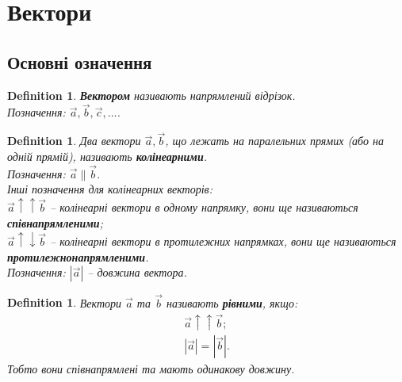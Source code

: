 \documentclass[a4paper, 10pt]{extarticle}
\theoremstyle{theoremdd}
\theoremstyle{theoremdd}
\newtheorem{definition}[theorem]{Definition}
\theoremstyle{theoremdd}
\theoremstyle{theoremdd}
\theoremstyle{theoremdd}
\theoremstyle{theoremdd}
\theoremstyle{theoremdd}
\theoremstyle{theoremdd}
\begin{document}
\tableofcontents
\newpage
	
\section{Вектори}
\subsection{Основні означення}
\begin{definition}
\textbf{Вектором} називають напрямлений відрізок.\\
Позначення: $\vec{a}, \vec{b}, \vec{c}, \dots$.
\begin{figure}[h]
\centering
{}
\end{figure}
\end{definition}

\begin{definition}
Два вектори $\vec{a},\vec{b}$, що лежать на паралельних прямих (або на одній прямій), називають \textbf{колінеарними}.\\
Позначення: $\vec{a} \parallel \vec{b}$.\\
Інші позначення для колінеарних векторів: \\ 
$\vec{a} \uparrow \uparrow \vec{b}$ -- колінеарні вектори в одному напрямку, вони ще називаються \textbf{співнапрямленими};\\
$\vec{a} \uparrow \downarrow \vec{b}$ -- колінеарні вектори в протилежних напрямках, вони ще називаються \textbf{протилежнонапрямленими}.
\bigskip \\
Позначення: $|\vec{a}|$ -- довжина вектора.
\end{definition}

\begin{definition}
Вектори $\vec{a}$ та $\vec{b}$ називають \textbf{рівними}, якщо:
	\begin{align*}
	\vec{a} \uparrow \uparrow \vec{b};\\
	|\vec{a}| = |\vec{b}|.
	\end{align*}
	Тобто вони співнапрямлені та мають одинакову довжину.
\end{definition}
\end{document}
